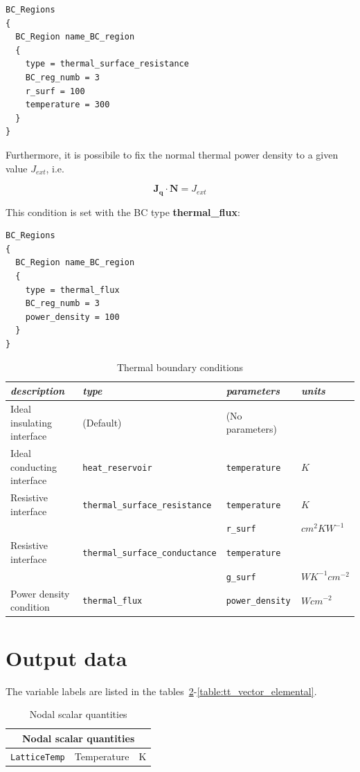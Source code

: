 \begin{verbatim}
BC_Regions
{
  BC_Region name_BC_region
  {
    type = thermal_surface_resistance
    BC_reg_numb = 3
    r_surf = 100 
    temperature = 300
  }
}
\end{verbatim}

Furthermore, it is possibile to fix the normal thermal power density  to a  given value $J_{ext}$, i.e.

\begin{equation}\label{TH}
\mathbf{J_q}\cdot \mathbf{N} = J_{ext}
\end{equation}

This condition is set with the BC type \textbf{thermal\_flux}:

\begin{verbatim}
BC_Regions
{
  BC_Region name_BC_region
  {
    type = thermal_flux
    BC_reg_numb = 3
    power_density = 100 
  }
}
\end{verbatim}
\begin{table}[htbp]
\center
\begin{tabular}{l||l||l||l}
\textit{description} & \textit{type} & \textit{parameters} & \textit{units}\\
\hline\hline
Ideal insulating interface & (Default) & (No parameters) &   \\
Ideal conducting interface & \texttt{heat\_reservoir} & \texttt{temperature} & $K$\\
Resistive interface &\texttt{thermal\_surface\_resistance } & \texttt{temperature} & $K$ \\
 & & \texttt{r\_surf} & $cm^2 K W^{-1}$\\
Resistive interface &\texttt{thermal\_surface\_conductance} & \texttt{temperature}\\
 & & \texttt{g\_surf} & $W K^{-1}cm^{-2} $\\
Power density condition& \texttt{thermal\_flux} & \texttt{power\_density} & $Wcm^{-2}$
\end{tabular}
\caption{Thermal boundary conditions}
\label{table:srh_params_db}
\end{table}
\section{Output data}
 
The variable labels are listed in the tables~\ref{table:tt_nodal}-\ref{table:tt_vector_elemental}.


\begin{table}[htb]
\center
\begin{tabular}{l|l|l}
\multicolumn{3}{c}{\textbf{Nodal scalar quantities}} \\
\hline 
\texttt{LatticeTemp} & Temperature & K \\
\end{tabular}
\caption{Nodal scalar quantities}
\label{table:tt_nodal}
\end{table}


